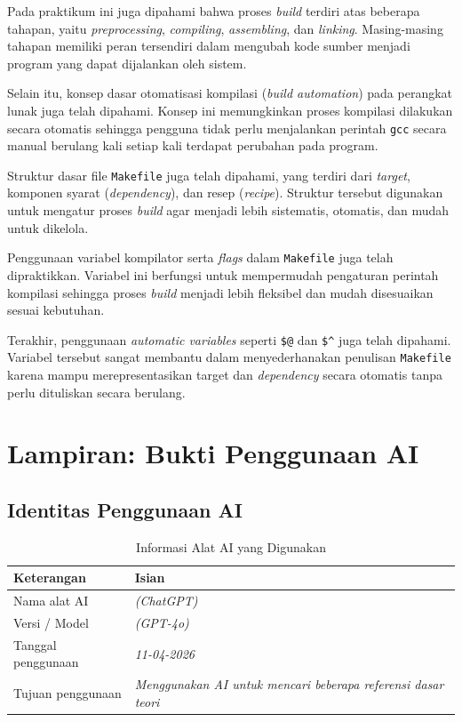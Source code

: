 {Pada praktikum ini juga dipahami bahwa proses \textit{build} terdiri atas beberapa tahapan, yaitu \textit{preprocessing}, \textit{compiling}, \textit{assembling}, dan \textit{linking}. Masing-masing tahapan memiliki peran tersendiri dalam mengubah kode sumber menjadi program yang dapat dijalankan oleh sistem.

Selain itu, konsep dasar otomatisasi kompilasi (\textit{build automation}) pada perangkat lunak juga telah dipahami. Konsep ini memungkinkan proses kompilasi dilakukan secara otomatis sehingga pengguna tidak perlu menjalankan perintah \texttt{gcc} secara manual berulang kali setiap kali terdapat perubahan pada program.

Struktur dasar file \texttt{Makefile} juga telah dipahami, yang terdiri dari \textit{target}, komponen syarat (\textit{dependency}), dan resep (\textit{recipe}). Struktur tersebut digunakan untuk mengatur proses \textit{build} agar menjadi lebih sistematis, otomatis, dan mudah untuk dikelola.

Penggunaan variabel kompilator serta \textit{flags} dalam \texttt{Makefile} juga telah dipraktikkan. Variabel ini berfungsi untuk mempermudah pengaturan perintah kompilasi sehingga proses \textit{build} menjadi lebih fleksibel dan mudah disesuaikan sesuai kebutuhan.

Terakhir, penggunaan \textit{automatic variables} seperti \verb|$@| dan \verb|$^| juga telah dipahami. Variabel tersebut sangat membantu dalam menyederhanakan penulisan \texttt{Makefile} karena mampu merepresentasikan target dan \textit{dependency} secara otomatis tanpa perlu dituliskan secara berulang.

\newpage
\section{Lampiran: Bukti Penggunaan AI}
\label{sec:lampiran-ai}

\subsection{Identitas Penggunaan AI}
\label{subsec:ai-info}

\begin{table}[h]
	\caption{Informasi Alat AI yang Digunakan}
	\label{tab:ai-info}
	\centering
	\begin{tabulary}{\textwidth}{|L|L|}
		\hline
		\textbf{Keterangan}   & \textbf{Isian} \\ \hline
		Nama alat AI          & \textit{(ChatGPT)} \\ \hline
		Versi / Model         & \textit{(GPT-4o)} \\ \hline
		Tanggal penggunaan    & \textit{11-04-2026} \\ \hline
		Tujuan penggunaan     & \textit{Menggunakan AI untuk mencari beberapa referensi dasar teori} \\ \hline
	\end{tabulary}
\end{table}

}
